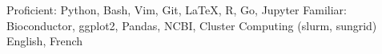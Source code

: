 \begin{cvskills}
    	    {Proficient: Python, Bash, Vim, Git, LaTeX, R, Go, Jupyter}
	\cvskill{}
            {Familiar: Bioconductor, ggplot2, Pandas, NCBI, Cluster Computing (slurm, sungrid)}
		    {English, French}
\end{cvskills}
